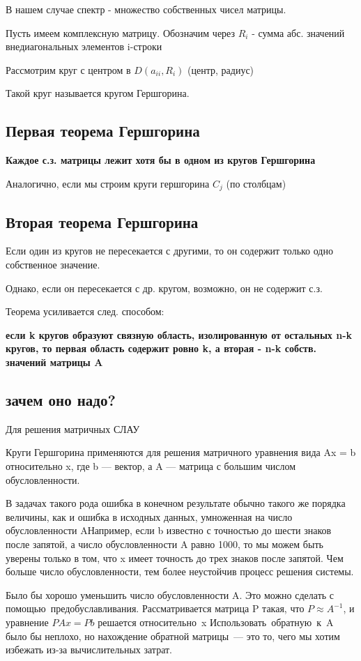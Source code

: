 \documentclass{article}
\begin{document}
В нашем случае спектр - множество собственных чисел матрицы.

Пусть имеем комплексную матрицу. Обозначим через $R_i$ - сумма абс. значений внедиагональных элементов i-строки

Рассмотрим круг с центром в $D(a_{ii}, R_i)$ (центр, радиус)

Такой круг называется кругом Гершгорина.
\subsection{Первая теорема Гершгорина}
\textbf{Каждое с.з. матрицы лежит хотя бы в одном из кругов Гершгорина}

Аналогично, если мы строим круги гершгорина $C_j$ (по столбцам)
\subsection{Вторая теорема Гершгорина}
Если один из кругов не пересекается с другими, то он содержит только одно собственное значение.

Однако, если он пересекается с др. кругом, возможно, он не содержит с.з.

Теорема усиливается след. способом:

\textbf{если k кругов образуют связную область, изолированную от остальных n-k кругов, то первая область содержит ровно k, а вторая - n-k собств. значений матрицы 
A}

\subsection{зачем оно надо?}
Для решения матричных СЛАУ

Круги Гершгорина применяются для решения матричного уравнения вида Ax = b относительно x, где b — вектор, а A — матрица с большим числом обусловленности.

В задачах такого рода ошибка в конечном результате обычно такого же порядка величины, как и ошибка в исходных данных, умноженная на число обусловленности AНапример, если b известно с точностью до шести знаков после запятой, а число обусловленности A равно 1000, то мы можем быть уверены только в том, что x имеет точность до трех знаков после запятой. Чем больше число обусловленности, тем более неустойчив процесс решения системы.

Было бы хорошо уменьшить число обусловленности A. Это можно сделать с помощью предобуславливания. Рассматривается матрица P такая, что $P\approx A^{-1}$, и уравнение $PAx = Pb$ решается относительно x Использовать обратную к A было бы неплохо, но нахождение обратной матрицы — это то, чего мы хотим избежать из-за вычислительных затрат.
\end{document}
